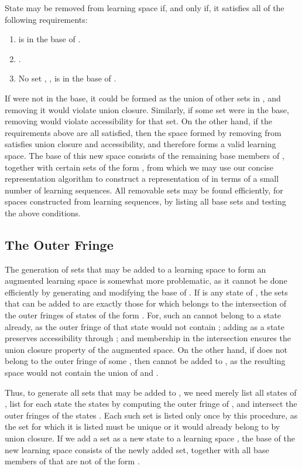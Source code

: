 \documentclass[11pt]{llncs}
\begin{document}
{State  may be removed from learning space  if, and only if, it satisfies all of the following requirements:
\begin{enumerate}
\item  is in the base of .
\item .
\item No set , , is in the base of .
\end{enumerate}
If  were not in the base, it could be formed as the union of other sets in , and removing it would violate union closure. Similarly, if some set  were in the base, removing  would violate accessibility for that set. On the other hand, if the requirements above are all satisfied, then the space formed by removing  from  satisfies union closure and accessibility, and therefore forms a valid learning space. The base of this new space consists of the remaining base members of , together with certain sets of the form , from which we may use our concise representation algorithm to construct a representation of  in terms of a small number of learning sequences.  All removable sets may be found efficiently, for spaces constructed from learning sequences, by listing all base sets and testing the above conditions.

\subsection{The Outer Fringe}

The generation of sets that may be added to a learning space  to form an augmented learning space is somewhat more problematic, as it cannot be done efficiently by generating and modifying the base of . If  is any state of , the sets  that can be added to  are exactly those for which  belongs to the intersection of the outer fringes of states of the form .
For, such an  cannot belong to a state  already, as the outer fringe of that state would not contain ; adding  as a state preserves accessibility through ; and membership in the intersection ensures the union closure property of the augmented space. On the other hand, if  does not belong to the outer fringe of some , then  cannot be added to , as the resulting space would not contain the union of  and .

Thus, to generate all sets that may be added to , we need merely list all states of , list for each state  the states  by computing the outer fringe of , and intersect the outer fringes of the states . Each such set is listed only once by this procedure, as the set  for which it is listed must be unique or it would already belong to  by union closure. If we add a set  as a new state to a learning space , the base of the new learning space consists of the newly added set, together with all base members of  that are not of the form .

}
\end{document}
